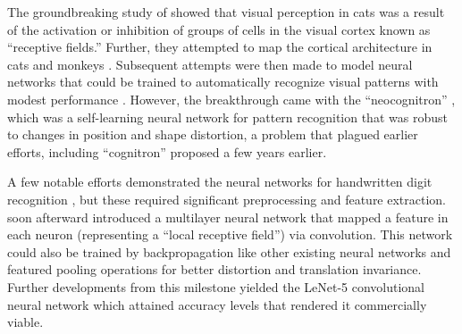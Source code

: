 \documentclass[Journal, letterpaper]{ascelike-new}
\newcommand{\?}{\stackrel{?}{=}}
\begin{document}
The groundbreaking study of  showed that visual perception in cats was a result of the
activation or inhibition of groups of cells in the visual cortex known as ``receptive fields.''  Further, they attempted
to map the cortical architecture in cats and monkeys \cite{hubel1962receptive,hubel1965receptive,hubel1968receptive}.
Subsequent attempts were then made to model neural networks that could be trained to automatically recognize visual patterns with modest performance \cite{rosenblatt1962principles,kabrisky1966proposed,giebel1971feature,fukushima1975cognitron}. However, the breakthrough came with the ``neocognitron'' \cite{fukushima1980neocognitron}, which
was a self-learning neural network for pattern recognition that was robust to changes in position and shape distortion, a problem that plagued earlier efforts, including ``cognitron'' \cite{fukushima1975cognitron} proposed a few years earlier.

A few notable efforts demonstrated the neural networks for handwritten digit recognition
\cite{fukushima1988neocognitron,denker1988neural}, but these required significant preprocessing and feature
extraction. \cite{lecun1989handwritten} soon afterward introduced a multilayer neural network that mapped a feature in each neuron (representing a ``local receptive field'') via convolution. This network could also be trained by backpropagation like other existing neural networks and featured pooling operations for better distortion and
translation invariance. Further developments from this milestone yielded the LeNet-5 convolutional neural network which attained accuracy levels that rendered it commercially viable.
\end{document}
